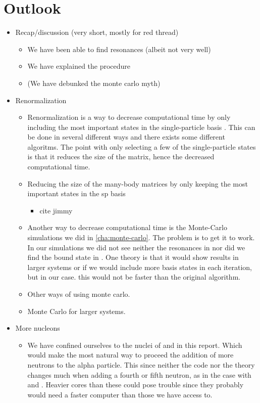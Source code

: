 \documentclass[../main/report.tex]{subfiles}
\begin{document}
\chapter{Outlook}
\label{cha:outlook}

\begin{itemize}
  \item Recap/discussion (very short, mostly for red thread)
  \begin{itemize}
    \item We have been able to find resonances (albeit not very well)
    \item We have explained the procedure
    \item (We have debunked the monte carlo myth)
  \end{itemize}
  \item Renormalization
  \begin{itemize}
    \item Renormalization is a way to decrease computational time by only including the most important states in the single-particle basis \cite{jimmy}.
    This can be done in several different ways and there exists some different algoritms.
    The point with only selecting a few of the single-particle states is that it reduces the size of the matrix, hence the decreased computational time.
    \item Reducing the size of the many-body matrices by only keeping the most important states in the sp basis
    \begin{itemize}
      \item cite jimmy
    \end{itemize}
    \item Another way to decrease computational time is the Monte-Carlo simulations we did in \cref{cha:monte-carlo}.
    The problem is to get it to work.
    In our simulations we did not see neither the resonances in  nor did we find the bound state in .
    One theory is that it would show results in larger systems or if we would include more basis states in each iteration, but in our case. this would not be faster than the original algorithm.
    \item Other ways of using monte carlo.
    \item Monte Carlo for larger systems.
  \end{itemize}

  \item More nucleons
  \begin{itemize}
    \item We have confined ourselves to the nuclei of  and  in this report.
    Which would make the most natural way to proceed the addition of more neutrons to the alpha particle.
    This since neither the code nor the theory changes much when adding a fourth or fifth neutron, as in the case with  and .
    Heavier cores than these could pose trouble since they probably would need a faster computer than those we have access to.


\end{itemize}
\end{itemize}
\end{document}

